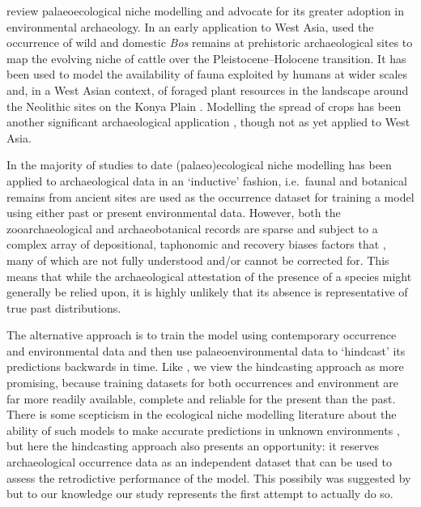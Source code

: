 \documentclass[
  authoryear,
  preprint]{elsarticle}
\begin{document}
\citet{FranklinEtAl2015} review palaeoecological niche modelling and
advocate for its greater adoption in environmental archaeology. In an
early application to West Asia, \citet{ConollyEtAl2012} used the
occurrence of wild and domestic \emph{Bos} remains at prehistoric
archaeological sites to map the evolving niche of cattle over the
Pleistocene--Holocene transition. It has been used to model the
availability of fauna exploited by humans at wider scales
\citep[e.g.][]{deAndresHerreroEtAl2018, YaworskyEtAl2023} and, in a West
Asian context, of foraged plant resources in the landscape around the
Neolithic sites on the Konya Plain \citep{CollinsEtAl2018}. Modelling
the spread of crops has been another significant archaeological
application \citep[e.g.][]{CremaEtAl}, though not as yet applied to West
Asia.

In the majority of studies to date (palaeo)ecological niche modelling
has been applied to archaeological data in an `inductive' fashion,
i.e.~faunal and botanical remains from ancient sites are used as the
occurrence dataset for training a model using either past or present
environmental data. However, both the zooarchaeological and
archaeobotanical records are sparse and subject to a complex array of
depositional, taphonomic and recovery biases factors that , many of
which are not fully understood and/or cannot be corrected for. This
means that while the archaeological attestation of the presence of a
species might generally be relied upon, it is highly unlikely that its
absence is representative of true past distributions.

The alternative approach is to train the model using contemporary
occurrence and environmental data and then use palaeoenvironmental data
to `hindcast' its predictions backwards in time. Like
\citet{FranklinEtAl2015}, we view the hindcasting approach as more
promising, because training datasets for both occurrences and
environment are far more readily available, complete and reliable for
the present than the past. There is some scepticism in the ecological
niche modelling literature about the ability of such models to make
accurate predictions in unknown environments \citep[like the
past,][]{FranklinEtAl2015}, but here the hindcasting approach also
presents an opportunity: it reserves archaeological occurrence data as
an independent dataset that can be used to assess the retrodictive
performance of the model. This possibily was suggested by
\citet{FranklinEtAl2015} but to our knowledge our study represents the
first attempt to actually do so.
\end{document}
